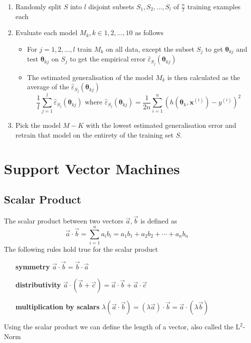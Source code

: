 \documentclass[11pt]{article}
\begin{document}
\begin{enumerate}
    \item Randomly split $S$ into $l$ disjoint subsets $S_1, S_2, ... , S_l$ of $\frac{n}{l}$ training examples each
    \item Evaluate each model $M_k, k\in{1,2, ... , 10}$ as follows
          \begin{itemize}
              \item For $j=1,2,...,l$ train $M_k$ on all data, except the subset $S_j$ to get $\bm{\theta}_{kj}$ and test $\bm{\theta}_{kj}$ on $S_j$ to get the empirical error $\hat{\varepsilon}_{S_j}(\bm{\theta}_{kj})$
              \item The estimated generalisation of the model $M_k$ is then calculated as the average of the $\hat{\varepsilon}_{S_j}(\bm{\theta}_{kj})$
                    \begin{equation*}
                        \frac{1}{l}\sum_{j=1}^{l}\hat{\varepsilon}_{S_j}(\bm{\theta}_{kj}) \text{ where } \hat{\varepsilon}_{S_j}(\bm{\theta}_{kj})=\frac{1}{2n}\sum_{i=1}^{n}(h(\bm{\theta}_k,\bm{x}^{(i)})-y^{(i)})^2
                    \end{equation*}
          \end{itemize}
    \item Pick the model $M-K$ with the lowest estimated generalisation error and retrain that model on the entirety of the training set $S$.
\end{enumerate}

\section{Support Vector Machines}

\subsection{Scalar Product}
The scalar product between two vectors $\vec{a}, \vec{b}$ is defined as
\begin{equation}
    \vec{a}\cdot\vec{b}=\sum_{i=1}^{n}a_i b_i = a_1 b_1 + a_2 b_2 + \cdots + a_n b_n
\end{equation}
\noindent
The following rules hold true for the scalar product

\begin{itemize}[leftmargin=*, labelindent=5cm, labelsep=0.5cm]
    \item[\textbf{symmetry}] $\vec{a}\cdot\vec{b} = \vec{b}\cdot\vec{a}$
    \item[\textbf{distributivity}] $\vec{a}\cdot(\vec{b}+\vec{c}) = \vec{a}\cdot\vec{b} + \vec{a}\cdot\vec{c} $
    \item[\textbf{multiplication by scalars}] $\lambda(\vec{a}\cdot\vec{b}) = (\lambda\vec{a})\cdot\vec{b} = \vec{a}\cdot(\lambda\vec{b})$
\end{itemize}
\noindent
Using the scalar product we can define the length of a vector, also called the $\text{L}^2$-Norm
\end{document}
